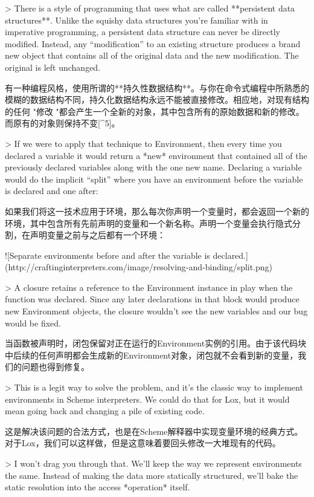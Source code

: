 \documentclass[cn,11pt,chinese]{elegantbook}
\begin{document}
{{{{{{{{{{{{> There is a style of programming that uses what are called **persistent data structures**. Unlike the squishy data structures you’re familiar with in imperative programming, a persistent data structure can never be directly modified. Instead, any “modification” to an existing structure produces a brand new object that contains all of the original data and the new modification. The original is left unchanged.

有一种编程风格，使用所谓的**持久性数据结构**。与你在命令式编程中所熟悉的模糊的数据结构不同，持久化数据结构永远不能被直接修改。相应地，对现有结构的任何 "修改 "都会产生一个全新的对象，其中包含所有的原始数据和新的修改。而原有的对象则保持不变[^5]。

> If we were to apply that technique to Environment, then every time you declared a variable it would return a *new* environment that contained all of the previously declared variables along with the one new name. Declaring a variable would do the implicit “split” where you have an environment before the variable is declared and one after:

如果我们将这一技术应用于环境，那么每次你声明一个变量时，都会返回一个新的环境，其中包含所有先前声明的变量和一个新名称。声明一个变量会执行隐式分割，在声明变量之前与之后都有一个环境：

![Separate environments before and after the variable is declared.](http://craftinginterpreters.com/image/resolving-and-binding/split.png)

> A closure retains a reference to the Environment instance in play when the function was declared. Since any later declarations in that block would produce new Environment objects, the closure wouldn’t see the new variables and our bug would be fixed.

当函数被声明时，闭包保留对正在运行的Environment实例的引用。由于该代码块中后续的任何声明都会生成新的Environment对象，闭包就不会看到新的变量，我们的问题也得到修复。

> This is a legit way to solve the problem, and it’s the classic way to implement environments in Scheme interpreters. We could do that for Lox, but it would mean going back and changing a pile of existing code.

这是解决该问题的合法方式，也是在Scheme解释器中实现变量环境的经典方式。对于Lox，我们可以这样做，但是这意味着要回头修改一大堆现有的代码。

> I won’t drag you through that. We’ll keep the way we represent environments the same. Instead of making the data more statically structured, we’ll bake the static resolution into the access *operation* itself.

}}}}}}}}}}}}
\end{document}
